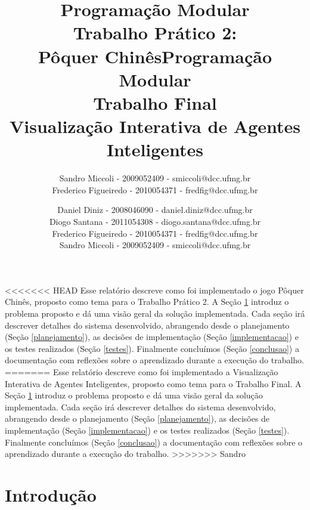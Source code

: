 \documentclass[12pt]{article}
\title{Programação Modular \\ Trabalho Prático 2: \\ Pôquer Chinês}
\author{Sandro Miccoli - 2009052409 - smiccoli@dcc.ufmg.br\\
		Frederico Figueiredo - 2010054371 - fredfig@dcc.ufmg.br}
\title{Programação Modular \\ Trabalho Final \\ Visualização Interativa de Agentes Inteligentes}
\author{Daniel Diniz - 2008046090 - daniel.diniz@dcc.ufmg.br\\
		Diogo Santana - 2011054308 - diogo.santana@dcc.ufmg.br\\
		Frederico Figueiredo - 2010054371 - fredfig@dcc.ufmg.br\\
		Sandro Miccoli - 2009052409 - smiccoli@dcc.ufmg.br}
\begin{document}
\maketitle


\begin{resumo}

<<<<<<< HEAD
Esse relatório descreve como foi implementado o jogo Pôquer Chinês, proposto como tema para o Trabalho Prático 2. A Seção \ref{introducao} introduz o problema proposto e dá uma visão geral da solução implementada. Cada seção irá descrever detalhes do sistema desenvolvido, abrangendo desde o planejamento (Seção \ref{planejamento}), as decisões de implementação (Seção \ref{implementacao}) e os testes realizados (Seção \ref{testes}). Finalmente concluímos (Seção \ref{conclusao}) a documentação com reflexões sobre o aprendizado durante a execução do trabalho.
=======
Esse relatório descreve como foi implementado a Visualização Interativa de Agentes Inteligentes, proposto como tema para o Trabalho Final. A Seção \ref{introducao} introduz o problema proposto e dá uma visão geral da solução implementada. Cada seção irá descrever detalhes do sistema desenvolvido, abrangendo desde o planejamento (Seção \ref{planejamento}), as decisões de implementação (Seção \ref{implementacao}) e os testes realizados (Seção \ref{testes}). Finalmente concluímos (Seção \ref{conclusao}) a documentação com reflexões sobre o aprendizado durante a execução do trabalho.
>>>>>>> Sandro

\end{resumo}

\section{Introdução}
\label{introducao}
\end{document}
